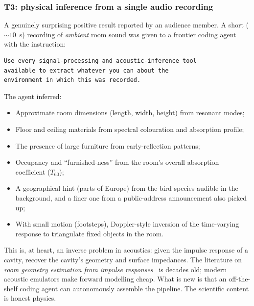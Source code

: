 \subsubsection{T3: physical inference from a single audio recording}

A genuinely surprising positive result reported by an
audience member.  A short ($\sim 10$~s) recording of
\emph{ambient} room sound was given to a frontier coding
agent with the instruction:

\begin{lstlisting}
Use every signal-processing and acoustic-inference tool
available to extract whatever you can about the
environment in which this was recorded.
\end{lstlisting}

The agent inferred:

\begin{itemize}
  \item Approximate room dimensions (length, width, height)
    from resonant modes;
  \item Floor and ceiling materials from spectral colouration
    and absorption profile;
  \item The presence of large furniture from
    early-reflection patterns;
  \item Occupancy and ``furnished-ness'' from the room's
    overall absorption coefficient ($T_{60}$);
  \item A geographical hint (parts of Europe) from the bird
    species audible in the background, and a finer one from
    a public-address announcement also picked up;
  \item With small motion (footsteps), Doppler-style
    inversion of the time-varying response to triangulate
    fixed objects in the room.
\end{itemize}

\begin{intuition}
  This is, at heart, an inverse problem in acoustics:
  given the impulse response of a cavity, recover the
  cavity's geometry and surface impedances.  The literature
  on \emph{room geometry estimation from impulse
  responses}~\cite{krijnen2014roomgeom,antonacci2012geometric}
  is decades old; modern acoustic emulators
  \cite{scheibler2018pyroomacoustics} make forward modelling
  cheap.  What is new is that an off-the-shelf coding agent
  can autonomously assemble the pipeline.  The scientific
  content is honest physics.
\end{intuition}

